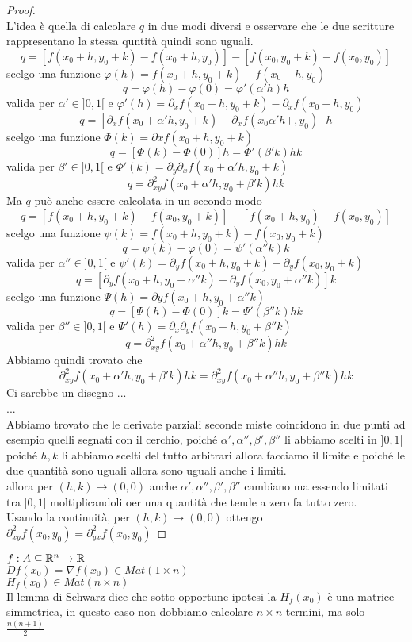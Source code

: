\begin{proof}
\begin{tikzpicture}
	\end{tikzpicture}\\
	L'idea è quella di calcolare $q$ in due modi diversi e osservare che le due scritture rappresentano la stessa quntità quindi sono uguali.\\
	$$q=[f(x_0+h,y_0+k)-f(x_0+h,y_0)]-[f(x_0,y_0+k)-f(x_0,y_0)]$$
	scelgo una funzione $\varphi(h)=f(x_0+h,y_0+k)-f(x_0+h,y_0)$
	$$q=\varphi(h)-\varphi(0) = \varphi'(\alpha' h)h$$
	valida per $\alpha'\in ]0,1[$ e $\varphi'(h)=\partial_{x}f(x_0+h,y_0+k)-\partial_{x}f(x_0+h,y_0)$
	$$q = [\partial_{x}f(x_0+\alpha'h,y_0+k)-\partial_{x}f(x_0\alpha'h+,y_0)]h$$
	scelgo una funzione $\varPhi(k)=\partial{x}f(x_0+h,y_0+k)$
	$$q=[\varPhi(k)-\varPhi(0)]h=\varPhi'(\beta'k)hk$$
	valida per $\beta'\in ]0,1[$ e $\varPhi'(k)=\partial_{y}\partial_{x}f(x_0+\alpha'h,y_0+k)$
	$$q = \partial^2_{xy}f(x_0+\alpha'h,y_0+\beta'k)hk$$
	Ma $q$ può anche essere calcolata in un secondo modo
	$$q=[f(x_0+h,y_0+k)-f(x_0,y_0+k)]-[f(x_0+h,y_0)-f(x_0,y_0)]$$
	scelgo una funzione $\psi(k)=f(x_0+h,y_0+k)-f(x_0,y_0+k)$
	$$q=\psi(k)-\varphi(0) = \psi'(\alpha''k)k$$
	valida per $\alpha''\in ]0,1[$ e $\psi'(k)=\partial_{y}f(x_0+h,y_0+k)-\partial_{y}f(x_0,y_0+k)$
	$$q = [\partial_{y}f(x_0+h,y_0+\alpha''k)-\partial_{y}f(x_0,y_0+\alpha''k)]k$$
	scelgo una funzione $\Psi(h)=\partial{y}f(x_0+h,y_0+\alpha''k)$
	$$q=[\Psi(h)-\varPhi(0)]k=\Psi'(\beta''k)hk$$
	valida per $\beta''\in ]0,1[$ e $\Psi'(h)=\partial_{x}\partial_{y}f(x_0+h,y_0+\beta''k)$
	$$q = \partial^2_{xy}f(x_0+\alpha''h,y_0+\beta''k)hk$$
	Abbiamo quindi trovato che 
	$$ \partial^2_{xy}f(x_0+\alpha'h,y_0+\beta'k)hk = \partial^2_{xy}f(x_0+\alpha''h,y_0+\beta''k)hk$$
	Ci sarebbe un disegno ...\\
	...\\
	Abbiamo trovato che le derivate parziali seconde miste coincidono in due punti ad esempio quelli segnati con il cerchio, poiché $\alpha',\alpha'',\beta{'},\beta''$ li abbiamo scelti in $]0,1[$\\
	poiché $h,k$ li abbiamo scelti del tutto arbitrari allora facciamo il limite e poiché le due quantità sono uguali allora sono uguali anche i limiti.\\
	allora per $(h,k)\rightarrow (0,0)$ anche $\alpha',\alpha'',\beta{'},\beta''$ cambiano ma essendo limitati tra $]0,1[$ moltiplicandoli oer una quantità che tende a zero fa tutto zero.\\
	Usando la continuità, per $(h,k)\rightarrow (0,0)$ ottengo $\partial^2_{xy}f(x_0,y_0)=\partial^2_{yx}f(x_0,y_0)$
\end{proof}
\observation
$f:A\subseteq \R^n\rightarrow \R$\\
$Df(x_0)=\nabla f(x_0) \in Mat(1\times n)$\\
$H_f(x_0)\in Mat(n\times n)$\\
Il lemma di Schwarz dice che sotto opportune ipotesi la $H_f(x_0)$ è una matrice simmetrica, in questo caso non dobbiamo calcolare $n\times n$ termini, ma solo $\frac{n(n+1)}{2}$

